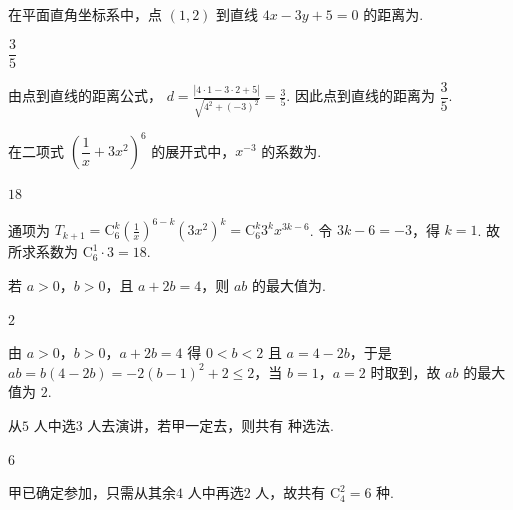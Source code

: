 \documentclass[UTF8,a4paper,oneside,11pt]{ctexbook}
\begin{document}
\begin{problem}
在平面直角坐标系中，点 \((1,2)\) 到直线 \(4x-3y+5=0\) 的距离为\fillinblank{}.
\end{problem}

\begin{answer}
\(\dfrac35\)
\end{answer}

\begin{solution}
由点到直线的距离公式，
\(d=\frac{|4\cdot1-3\cdot2+5|}{\sqrt{4^2+(-3)^2}}=\frac{3}{5}\).
因此点到直线的距离为 \(\dfrac35\).
\end{solution}

\begin{problem}
在二项式 \(\left(\dfrac1x+3x^2\right)^6\) 的展开式中，\(x^{-3}\) 的系数为\fillinblank{}.
\end{problem}

\begin{answer}
\(18\)
\end{answer}

\begin{solution}
通项为
\(T_{k+1}=\mathrm C_6^k\left(\frac1x\right)^{6-k}(3x^2)^k=\mathrm C_6^k3^kx^{3k-6}\).
令 \(3k-6=-3\)，得 \(k=1\). 故所求系数为 \(\mathrm C_6^1\cdot3=18\).
\end{solution}

\begin{problem}
若 \(a>0\)，\(b>0\)，且 \(a+2b=4\)，则 \(ab\) 的最大值为\fillinblank{}.
\end{problem}

\begin{answer}
\(2\)
\end{answer}

\begin{solution}
由 \(a>0\)，\(b>0\)，\(a+2b=4\) 得 \(0<b<2\) 且 \(a=4-2b\)，于是 \(ab=b(4-2b)=-2(b-1)^2+2\le2\)，当 \(b=1\)，\(a=2\) 时取到，故 \(ab\) 的最大值为 \(2\).
\end{solution}

\begin{problem}
从\(5\text{ 人}\)中选\(3\text{ 人}\)去演讲，若甲一定去，则共有\fillinblank{}\(\text{ 种}\)选法.
\end{problem}

\begin{answer}
\(6\)
\end{answer}

\begin{solution}
甲已确定参加，只需从其余\(4\text{ 人}\)中再选\(2\text{ 人}\)，故共有 \(\mathrm C_4^2=6\text{ 种}\).
\end{solution}
\end{document}
